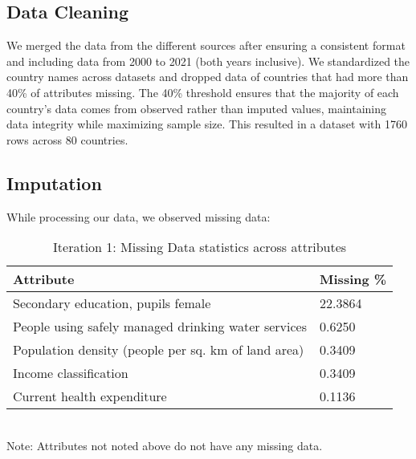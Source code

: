 \documentclass[10pt,a4paper]{article}
\begin{document}
    \subsection{Data Cleaning}
    We merged the data from the different sources after ensuring a consistent format and including data from 2000 to 2021 (both years inclusive). We standardized the country names across datasets and dropped data of countries that had more than 40\% of attributes missing. The 40\% threshold ensures that the majority of each country's data comes from observed rather than imputed values, maintaining data integrity while maximizing sample size. This resulted in a dataset with 1760 rows across 80 countries.

    \subsection{Imputation}
    While processing our data, we observed missing data:    		
        \begin{table}[H]
            \centering
            \caption{Iteration 1: Missing Data statistics across attributes}
            \label{tab:table}
            \begin{tabular}{ll}
                \toprule
                \textbf{Attribute} & \textbf{Missing \%} \\
                \midrule
                Secondary education, pupils female &  22.3864 \\
                People using safely managed drinking water services & 0.6250 \\
                Population density (people per sq. km of land area) & 0.3409 \\
                Income classification & 0.3409 \\
                Current health expenditure & 0.1136 \\
                \bottomrule   
            \end{tabular} \\
            \footnotesize{Note: Attributes not noted above do not have any missing data.}\\
        \end{table}
\end{document}
